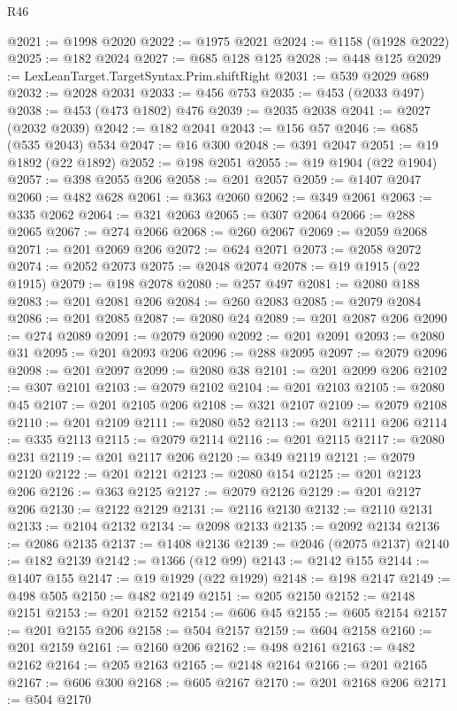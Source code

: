\begin{lexlean}{R46}
\begin{coremodule}
@2021 := @1998 @2020
@2022 := @1975 @2021
@2024 := @1158 (@1928 @2022)
@2025 := @182 @2024
@2027 := @685 @128 @125
@2028 := @448 @125
@2029 := LexLeanTarget.TargetSyntax.Prim.shiftRight
@2031 := @539 @2029 @689
@2032 := @2028 @2031
@2033 := @456 @753
@2035 := @453 (@2033 @497)
@2038 := @453 (@473 @1802) @476
@2039 := @2035 @2038
@2041 := @2027 (@2032 @2039)
@2042 := @182 @2041
@2043 := @156 @57
@2046 := @685 (@535 @2043) @534
@2047 := @16 @300
@2048 := @391 @2047
@2051 := @19 @1892 (@22 @1892)
@2052 := @198 @2051
@2055 := @19 @1904 (@22 @1904)
@2057 := @398 @2055 @206
@2058 := @201 @2057
@2059 := @1407 @2047
@2060 := @482 @628
@2061 := @363 @2060
@2062 := @349 @2061
@2063 := @335 @2062
@2064 := @321 @2063
@2065 := @307 @2064
@2066 := @288 @2065
@2067 := @274 @2066
@2068 := @260 @2067
@2069 := @2059 @2068
@2071 := @201 @2069 @206
@2072 := @624 @2071
@2073 := @2058 @2072
@2074 := @2052 @2073
@2075 := @2048 @2074
@2078 := @19 @1915 (@22 @1915)
@2079 := @198 @2078
@2080 := @257 @497
@2081 := @2080 @188
@2083 := @201 @2081 @206
@2084 := @260 @2083
@2085 := @2079 @2084
@2086 := @201 @2085
@2087 := @2080 @24
@2089 := @201 @2087 @206
@2090 := @274 @2089
@2091 := @2079 @2090
@2092 := @201 @2091
@2093 := @2080 @31
@2095 := @201 @2093 @206
@2096 := @288 @2095
@2097 := @2079 @2096
@2098 := @201 @2097
@2099 := @2080 @38
@2101 := @201 @2099 @206
@2102 := @307 @2101
@2103 := @2079 @2102
@2104 := @201 @2103
@2105 := @2080 @45
@2107 := @201 @2105 @206
@2108 := @321 @2107
@2109 := @2079 @2108
@2110 := @201 @2109
@2111 := @2080 @52
@2113 := @201 @2111 @206
@2114 := @335 @2113
@2115 := @2079 @2114
@2116 := @201 @2115
@2117 := @2080 @231
@2119 := @201 @2117 @206
@2120 := @349 @2119
@2121 := @2079 @2120
@2122 := @201 @2121
@2123 := @2080 @154
@2125 := @201 @2123 @206
@2126 := @363 @2125
@2127 := @2079 @2126
@2129 := @201 @2127 @206
@2130 := @2122 @2129
@2131 := @2116 @2130
@2132 := @2110 @2131
@2133 := @2104 @2132
@2134 := @2098 @2133
@2135 := @2092 @2134
@2136 := @2086 @2135
@2137 := @1408 @2136
@2139 := @2046 (@2075 @2137)
@2140 := @182 @2139
@2142 := @1366 (@12 @99)
@2143 := @2142 @155
@2144 := @1407 @155
@2147 := @19 @1929 (@22 @1929)
@2148 := @198 @2147
@2149 := @498 @505
@2150 := @482 @2149
@2151 := @205 @2150
@2152 := @2148 @2151
@2153 := @201 @2152
@2154 := @606 @45
@2155 := @605 @2154
@2157 := @201 @2155 @206
@2158 := @504 @2157
@2159 := @604 @2158
@2160 := @201 @2159
@2161 := @2160 @206
@2162 := @498 @2161
@2163 := @482 @2162
@2164 := @205 @2163
@2165 := @2148 @2164
@2166 := @201 @2165
@2167 := @606 @300
@2168 := @605 @2167
@2170 := @201 @2168 @206
@2171 := @504 @2170

\end{coremodule}
\end{lexlean}
